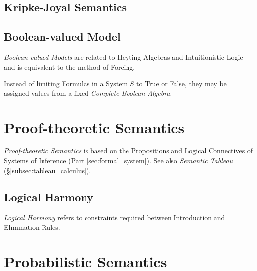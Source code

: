 \subsection{Kripke-Joyal Semantics}

\subsection{Boolean-valued Model}

\emph{Boolean-valued Models} are related to Heyting Algebras and
Intuitionistic Logic and is equivalent to the method of Forcing.

Instead of limiting Formulas in a System $S$ to True or False, they
may be assigned values from a fixed \emph{Complete Boolean Algebra}.



\section{Proof-theoretic Semantics}

\emph{Proof-theoretic Semantics} is based on the Propositions and
Logical Connectives of Systems of Inference (Part
\ref{sec:formal_system}). See also \emph{Semantic Tableau}
(\S\ref{subsec:tableau_calculus}).

\subsection{Logical Harmony} \label{subsec:logical_harmony}

\emph{Logical Harmony} refers to constraints required between
Introduction and Elimination Rules.



\section{Probabilistic Semantics}

